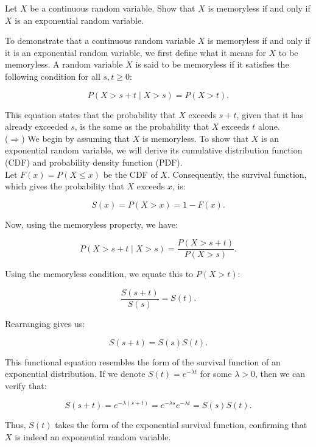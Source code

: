     

\begin{exercise}
Let \( X \) be a continuous random variable. Show that \( X \) is memoryless if and only if \( X \) is an exponential random variable.
\end{exercise}

\begin{solution}
To demonstrate that a continuous random variable \( X \) is memoryless if and only if it is an exponential random variable, we first define what it means for \( X \) to be memoryless. A random variable \( X \) is said to be memoryless if it satisfies the following condition for all \( s, t \geq 0 \):

\[
P(X > s + t \mid X > s) = P(X > t).
\]

This equation states that the probability that \( X \) exceeds \( s + t \), given that it has already exceeded \( s \), is the same as the probability that \( X \) exceeds \( t \) alone. \\

(\(\Rightarrow\)) We begin by assuming that \( X \) is memoryless. To show that \( X \) is an exponential random variable, we will derive its cumulative distribution function (CDF) and probability density function (PDF).\\

Let \( F(x) = P(X \leq x) \) be the CDF of \( X \). Consequently, the survival function, which gives the probability that \( X \) exceeds \( x \), is:

\[
S(x) = P(X > x) = 1 - F(x).
\]

Now, using the memoryless property, we have:

\[
P(X > s + t \mid X > s) = \frac{P(X > s + t)}{P(X > s)}.
\]

Using the memoryless condition, we equate this to \( P(X > t) \):

\[
\frac{S(s+t)}{S(s)} = S(t).
\]

Rearranging gives us:

\[
S(s + t) = S(s) S(t).
\]

This functional equation resembles the form of the survival function of an exponential distribution. If we denote \( S(t) = e^{-\lambda t} \) for some \( \lambda > 0 \), then we can verify that:

\[
S(s+t) = e^{-\lambda (s+t)} = e^{-\lambda s} e^{-\lambda t} = S(s) S(t).
\]

Thus, \( S(t) \) takes the form of the exponential survival function, confirming that \( X \) is indeed an exponential random variable.\\


\end{solution}
